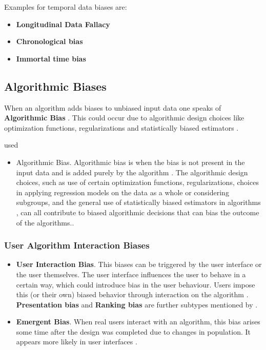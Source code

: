 \documentclass[12pt, a4paper, oneside]{book}   	%
\renewcommand{\paragraph}[1]{%
	\subsubsection*{#1}%
}
\newif\ifrawcitationactive
\newcommand{\rawcitationstart}{
	\color{purple}\rawcitationactivetrue
}
\newcommand{\rawcitationend}{
	\color{black}\rawcitationactivefalse
}
\newcommand{\rawcitationusedstart}{\color{violet}}
\newcommand{\rawcitationusedend}{%
	\ifrawcitationactive
	\color{purple}  %
	\else
	\color{black}  %
	\fi
}
\begin{document}
			Examples for temporal data biases are:
			\begin{itemize}
				\item \textbf{Longitudinal Data Fallacy} \autocite{Mehrabi_2021}
				\item \textbf{Chronological bias} \autocite{Chakraborty_2024, c9, c13}
				\item \textbf{Immortal time bias} \autocite{Chakraborty_2024, c24, c20}
			\end{itemize}
			
			\subsection{Algorithmic Biases}
			When an algorithm adds biases to unbiased input data one speaks of \textbf{Algorithmic Bias} \autocite{M9_Baeza-Yates_2018}. This could occur due to algorithmic design choices like optimization functions, regularizations and statistically biased estimators \autocite{M44_Danks_2017}.
			
			\rawcitationstart
			used
			\begin{itemize}		
				\rawcitationusedstart
				\item Algorithmic Bias. Algorithmic bias is when the bias is not present in the input data and is added purely by the algorithm \autocite{M9_Baeza-Yates_2018}. The algorithmic design choices, such as use of certain optimization functions, regularizations, choices in applying regression models on the data as a whole or considering subgroups, and the general use of statistically biased estimators in algorithms \autocite{M44_Danks_2017}, can all contribute to biased algorithmic decisions that can bias the outcome of the algorithms.\autocite{Mehrabi_2021}.
				\rawcitationusedend
			\end{itemize}
			\rawcitationend
				
			\paragraph{User Algorithm Interaction Biases}
				\begin{itemize}
					\item \textbf{User Interaction Bias}. This biases can be triggered by the user interface or the user themselves. The user interface influences the user to behave in a certain way, which could introduce bias in the user behaviour. Users impose this (or their own) biased behavior through interaction on the algorithm \autocite{M9_Baeza-Yates_2018}. \textbf{Presentation bias} and \textbf{Ranking bias} are further subtypes mentioned by \cites{M93_Lerman_2014}{Mehrabi_2021}.
					\item \textbf{Emergent Bias}. When real users interact with an algorithm, this bias arises some time after the design was completed due to changes in population. It appears more likely in user interfaces \autocite{M53_Friedman_1996}.
				\end{itemize}
			
\end{document}
